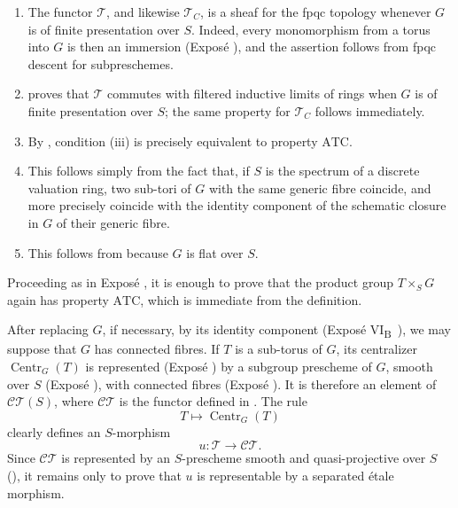 \begin{enumerate}
\renewcommand{\labelenumi}{\textup{\roman{enumi})}}
\item The functor \(\mathcal T\), and likewise \(\mathcal T_C\), is
a sheaf for the fpqc topology whenever \(G\) is of finite
presentation over \(S\). Indeed, every monomorphism from a torus
into \(G\) is then an immersion (Exposé ), and the assertion
follows from fpqc descent for subpreschemes.

\item {} proves that \(\mathcal T\) commutes with filtered
inductive limits of rings when \(G\) is of finite presentation over
\(S\); the same property for \(\mathcal T_C\) follows immediately.

\item By , condition \textup{(iii)} is precisely
equivalent to property \(\mathrm{ATC}\).

\item This follows simply from the fact that, if \(S\) is the spectrum of
a discrete valuation ring, two sub-tori of \(G\) with the same generic
fibre coincide, and more precisely coincide with the identity component of
the schematic closure in \(G\) of their generic fibre.

\item This follows from  because \(G\) is flat over
\(S\).
\end{enumerate}

Proceeding as in Exposé , it is enough to prove that the
product group \(T\times_S G\) again has property
\(\mathrm{ATC}\), which is immediate from the definition.

After replacing \(G\), if necessary, by its identity component
(Exposé VI\textsubscript{B}~), we may suppose that \(G\) has
connected fibres. If \(T\) is a sub-torus of \(G\), its centralizer
\(\operatorname{Centr}_G(T)\) is represented (Exposé ) by a
subgroup prescheme of \(G\), smooth over \(S\)
(Exposé ), with connected fibres
(Exposé ). It is therefore an element of
\(\mathcal{CT}(S)\), where \(\mathcal{CT}\) is the functor defined
in . The rule
\[
  T\longmapsto\operatorname{Centr}_G(T)
\]
clearly defines an \(S\)-morphism
\[
  u:\mathcal T\longrightarrow\mathcal{CT}.
\]
Since \(\mathcal{CT}\) is represented by an \(S\)-prescheme smooth
and quasi-projective over \(S\) (), it remains only to prove
that \(u\) is representable by a separated étale morphism.

